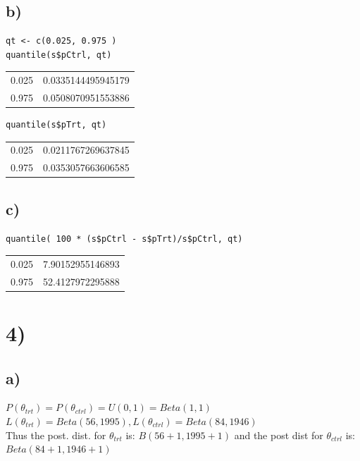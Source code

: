 \documentclass[11pt]{article}
\begin{document}
\subsection*{b)}
\label{sec:org23a6fae}

\begin{verbatim}
qt <- c(0.025, 0.975 )
quantile(s$pCtrl, qt)
\end{verbatim}

\begin{center}
\begin{tabular}{rr}
0.025 & 0.0335144495945179\\
0.975 & 0.0508070951553886\\
\end{tabular}
\end{center}

\begin{verbatim}
quantile(s$pTrt, qt)
\end{verbatim}

\begin{center}
\begin{tabular}{rr}
0.025 & 0.0211767269637845\\
0.975 & 0.0353057663606585\\
\end{tabular}
\end{center}

\subsection*{c)}
\label{sec:orgd2107d4}

\begin{verbatim}
quantile( 100 * (s$pCtrl - s$pTrt)/s$pCtrl, qt)
\end{verbatim}


\begin{center}
\begin{tabular}{rr}
0.025 & 7.90152955146893\\
0.975 & 52.4127972295888\\
\end{tabular}
\end{center}

\section*{4)}
\label{sec:org5e2d779}

\subsection*{a)}
\label{sec:orgfdc7a89}
$P(\theta_{trt}) = P(\theta_{ctrl}) = U(0,1) = Beta(1,1)$\\
$L(\theta_{trt}) = Beta(56, 1995), L(\theta_{ctrl}) = Beta(84, 1946)$\\
Thus the post. dist. for $\theta_{trt}$ is: $B(56 + 1, 1995 + 1)$ and the post
dist for $\theta_{ctrl}$ is: $Beta(84 + 1, 1946 + 1)$
\end{document}
